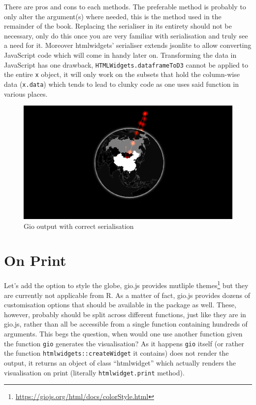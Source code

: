 \documentclass[
]{krantz}
\renewcommand{\href}[2]{#2\footnote{\url{#1}}}
\begin{document}
There are pros and cons to each methods. The preferable method is probably to only alter the argument(s) where needed, this is the method used in the remainder of the book. Replacing the serialiser in its entirety should not be necessary, only do this once you are very familiar with serialisation and truly see a need for it. Moreover htmlwidgets' serialiser extends jsonlite to allow converting JavaScript code which will come in handy later on. Transforming the data in JavaScript has one drawback, \texttt{HTMLWidgets.dataframeToD3} cannot be applied to the entire \texttt{x} object, it will only work on the subsets that hold the column-wise data (\texttt{x.data}) which tends to lead to clunky code as one uses said function in various places.

\begin{figure}
\centering
\includegraphics{images/gio-data.png}
\caption{Gio output with correct serialisation}
\end{figure}

\hypertarget{on-print}{%
\section{On Print}\label{on-print}}

Let's add the option to style the globe, gio.js provides mutliple \href{https://giojs.org/html/docs/colorStyle.html}{themes} but they are currently not applicable from R. As a matter of fact, gio.js provides dozens of customisation options that should be available in the package as well. These, however, probably should be split across different functions, just like they are in gio.js, rather than all be accessible from a single function containing hundreds of arguments. This begs the question, when would one use another function given the function \texttt{gio} generates the visualisation? As it happens \texttt{gio} itself (or rather the function \texttt{htmlwidgets::createWidget} it contains) does not render the output, it returns an object of class ``htmlwidget'' which actually renders the visualisation on print (literally \texttt{htmlwidget.print} method).
\end{document}
